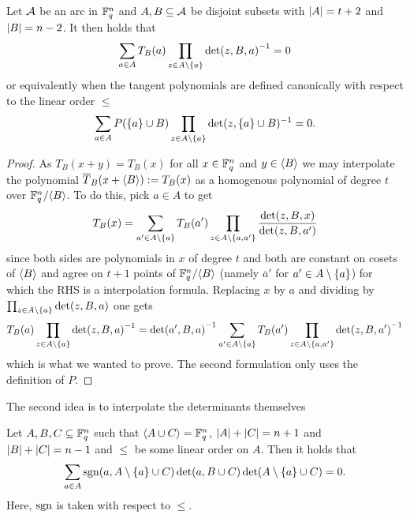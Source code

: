 \begin{lemma}
    Let $\mathcal{A}$ be an arc in $\mathbb{F}_{q}^n$ and $A,B\subseteq \mathcal{A}$ be disjoint subsets with
    $\left|A\right|=t+2$ and $\left|B\right|=n-2$. It then holds that
    $$
    \sum_{a\in A}{T_{B}(a)\prod_{z\in A\setminus \left\{a\right\}}{\det(z,B,a)}^{-1}} =0
    $$
    or equivalently when the tangent polynomials are defined canonically
    with respect to the linear order $\leq$
    $$
    \sum_{a\in A}{P(\left\{a\right\}\cup B)\prod_{z\in A\setminus\left\{a\right\}}\det(z,\left\{a\right\}\cup B)^{-1}}=0.
    $$
\end{lemma}
%
\begin{proof}
    As $T_B(x+y)=T_B(x)$ for all $x\in\mathbb{F}_{q}^n$ and $y\in\gen B$ we may
    interpolate the polynomial $\bar{T}_B(x+\gen B):=T_{B}(x)$ as a homogenous polynomial of
    degree $t$ over $\field{q}^n/\gen B$. To do this, pick $a\in A$ to get
    $$
    T_B(x)=\sum_{a'\in A\setminus\left\{a\right\}}{T_B(a')\prod_{z\in A\setminus\left\{a,a'\right\}}{\frac{\det(z,B,x)}{\det(z,B,a')}}}
    $$
    since both sides are polynomials in $x$ of degree $t$
    and both are constant on cosets of $\gen B$ and agree on $t+1$
    points of $\field{q}^n/\gen B$ (namely $\overline{a}'$
    for $a'\in A\setminus\left\{a\right\}$) for which the RHS is a  interpolation formula. Replacing $x$ by $a$ and dividing by
  $\prod_{z\in A\setminus\left\{a\right\}}{\det(z,B,a)}$ one gets 
  $$
  T_B(a)\prod_{z\in  A\setminus\left\{a\right\}}{{\det(z,B,a)}^{-1}} = {\det(a',B,a)}^{-1}\sum_{a'\in A\setminus\left\{a\right\}}{T_B(a')\prod_{z\in A\setminus\left\{a,a'\right\}}{{\det(z,B,a')}^{-1}}}
  $$
  which is what we wanted to prove.
  The second formulation only uses the definition of $P$.
\end{proof}

The second idea is to interpolate the determinants themselves
\begin{lemma}\label{mds-tan-poly-interpol-det}
    Let $A,B,C\subseteq \mathbb{F}_{q}^n$ such that $\gen{A\setjoin
    C}=\field{q}^n$, $\left|A\right|+\left|C\right|=n+1$ and $\left|B\right|+\left|C\right|=n-1$ and $\leq$
    be some linear order on $A$. Then it holds that
    $$
    \sum_{a\in A}{\mathop\mathrm{sgn}(a,A\setminus\left\{a\right\}\cup C)\det(a,B\cup C)\det(A\setminus\left\{a\right\}\cup C)}=0\text{.}
    $$
    Here, $\mathop\mathrm{sgn}$ is taken with respect to $\leq$.
\end{lemma}

